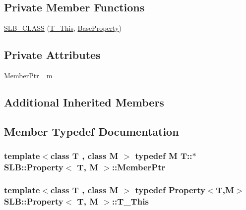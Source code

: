 \subsection*{Private Member Functions}
\begin{DoxyCompactItemize}
\item 
\hyperlink{classSLB_1_1Property_ac1de9d018e6b238454b82548139c8127}{S\+L\+B\+\_\+\+C\+L\+A\+SS} (\hyperlink{classSLB_1_1Property_ac665de45ed6410c4b8ad1c5eb4b26c14}{T\+\_\+\+This}, \hyperlink{classSLB_1_1BaseProperty}{Base\+Property})
\end{DoxyCompactItemize}
\subsection*{Private Attributes}
\begin{DoxyCompactItemize}
\item 
\hyperlink{classSLB_1_1Property_a541f26b6822fdda94191912a156e895f}{Member\+Ptr} \hyperlink{classSLB_1_1Property_af1476526515ae5416ddb0938a6944f32}{\+\_\+m}
\end{DoxyCompactItemize}
\subsection*{Additional Inherited Members}


\subsection{Member Typedef Documentation}
\subsubsection[{\texorpdfstring{Member\+Ptr}{MemberPtr}}]{\setlength{\rightskip}{0pt plus 5cm}template$<$class T , class M $>$ typedef M T\+::$\ast$ {\bf S\+L\+B\+::\+Property}$<$ T, M $>$\+::{\bf Member\+Ptr}}\hypertarget{classSLB_1_1Property_a541f26b6822fdda94191912a156e895f}{}\label{classSLB_1_1Property_a541f26b6822fdda94191912a156e895f}
\subsubsection[{\texorpdfstring{T\+\_\+\+This}{T_This}}]{\setlength{\rightskip}{0pt plus 5cm}template$<$class T , class M $>$ typedef {\bf Property}$<$T,M$>$ {\bf S\+L\+B\+::\+Property}$<$ T, M $>$\+::{\bf T\+\_\+\+This}\hspace{0.3cm}{\ttfamily [private]}}\hypertarget{classSLB_1_1Property_ac665de45ed6410c4b8ad1c5eb4b26c14}{}\label{classSLB_1_1Property_ac665de45ed6410c4b8ad1c5eb4b26c14}


